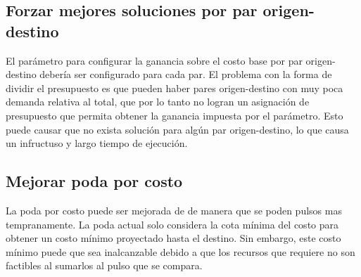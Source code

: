 \documentclass{article}
\begin{document}
  \subsection*{Forzar mejores soluciones por par origen-destino}

  El parámetro para configurar la ganancia sobre el costo base por par origen-destino debería ser configurado para cada par. El problema con la forma de dividir el presupuesto es que pueden haber pares origen-destino con muy poca demanda relativa al total, que por lo tanto no logran un asignación de presupuesto que permita obtener la ganancia impuesta por el parámetro. Esto puede causar que no exista solución para algún par origen-destino, lo que causa un infructuso y largo tiempo de ejecución.

  \subsection*{Mejorar poda por costo}

  La poda por costo puede ser mejorada de de manera que se poden pulsos mas tempranamente. La poda actual solo considera la cota mínima del costo para obtener un costo mínimo proyectado hasta el destino. Sin embargo, este costo mínimo puede que sea inalcanzable debido a que los recursos que requiere no son factibles al sumarlos al pulso que se compara.
\end{document}
